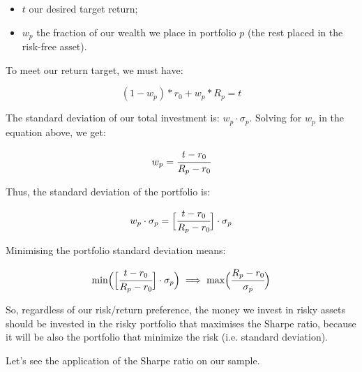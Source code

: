 \begin{itemize}
\tightlist
\item
  \(t\) our desired target return;
\item
  \(w_p\) the fraction of our wealth we place in portfolio \(p\) (the
  rest placed in the risk-free asset).
\end{itemize}

To meet our return target, we must have:

\[ (1 - w_p) * r_0 + w_p * R_p = t \]

The standard deviation of our total investment is:
\(w_p\cdot \sigma_p\). Solving for \(w_p\) in the equation above, we
get:

\[ w_p = \cfrac{t - r_0}{R_p - r_0} \]

Thus, the standard deviation of the portfolio is:

\[ w_p\cdot \sigma_p = \Big[\cfrac{t - r_0}{R_p - r_0}\Big]\cdot \sigma_p \]

Minimising the portfolio standard deviation means:

\[ \textrm{min}\Big(\Big[\cfrac{t - r_0}{R_p - r_0}\Big]\cdot \sigma_p\Big)\implies\textrm{max}\Big(\cfrac{R_p - r_0}{\sigma_p}\Big) \]

So, regardless of our risk/return preference, the money we invest in
risky assets should be invested in the risky portfolio that maximises
the Sharpe ratio, because it will be also the portfolio that minimize 
the risk (i.e. standard deviation).

Let's see the application of the Sharpe ratio on our sample.

